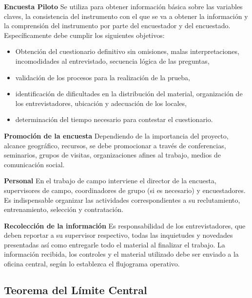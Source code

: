 \documentclass[a5paper,doc,10pt,noapacite]{apa6}
\begin{document}
{{	\vspace{0.75\baselineskip}
	\textbf{Encuesta Piloto}\newline
	Se utiliza para obtener información básica sobre las variables claves, la consistencia del instrumento con el que se va a obtener la información y la comprensión del instrumento por parte del encuestador y del encuestado. Específicamente debe cumplir los siguientes objetivos:
	\begin{itemize}
		\item Obtención del cuestionario definitivo sin omisiones, malas interpretaciones, incomodidades al entrevistado, secuencia lógica de las preguntas,
		\item validación de los procesos para la realización de la prueba,
		\item identificación de dificultades en la distribución del material, organización de los entrevistadores, ubicación y adecuación de los locales,
		\item determinación del tiempo necesario para contestar el cuestionario.
	\end{itemize}
	
	\vspace{0.75\baselineskip}
	\textbf{Promoción de la encuesta}\newline
	Dependiendo de la importancia del proyecto, alcance geográfico, recursos, se debe promocionar a través de conferencias, seminarios, grupos de visitas, organizaciones afines al trabajo, medios de comunicación social.
	
	\vspace{0.75\baselineskip}
	\textbf{Personal}\newline
	En el trabajo de campo interviene el director de la encuesta, supervisores de campo, coordinadores de grupo (si es necesario) y encuestadores. Es indispensable organizar las actividades correspondientes a su reclutamiento, entrenamiento, selección y contratación.
	
	\vspace{0.75\baselineskip}
	\textbf{Recolección de la información}\newline
	Es responsabilidad de los entrevistadores, que deben reportar a su supervisor respectivo, todas las inquietudes y novedades presentadas así como entregarle todo el material al finalizar el trabajo. La información recibida, los controles y el material utilizado debe ser enviado a la oficina central, según lo establezca el flujograma operativo.
	
%
\subsection{Teorema del Límite Central}

}}
\end{document}
